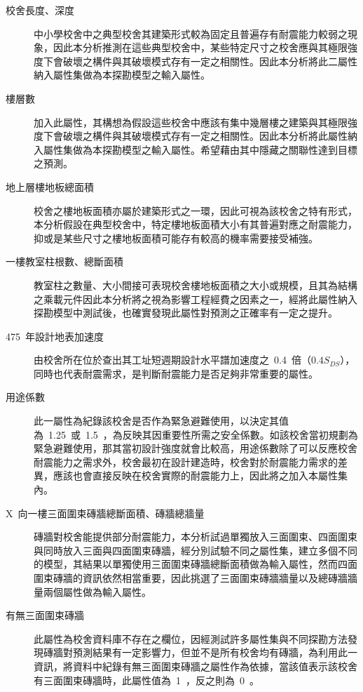 \begin{description}
  \item[校舍長度、深度]
  中小學校舍中之典型校舍其建築形式較為固定且普遍存有耐震能力較弱之現象，因此本分析推測在這些典型校舍中，某些特定尺寸之校舍應與其極限強度下會破壞之構件與其破壞模式存有一定之相關性。因此本分析將此二屬性納入屬性集做為本探勘模型之輸入屬性。
  \item[樓層數]
  加入此屬性，其構想為假設這些校舍中應該有集中幾層樓之建築與其極限強度下會破壞之構件與其破壞模式存有一定之相關性。因此本分析將此屬性納入屬性集做為本探勘模型之輸入屬性。希望藉由其中隱藏之關聯性達到目標之預測。
  \item[地上層樓地板總面積]
  校舍之樓地板面積亦屬於建築形式之一環，因此可視為該校舍之特有形式，本分析假設在典型校舍中，特定樓地板面積大小有其普遍對應之耐震能力，抑或是某些尺寸之樓地板面積可能存有較高的機率需要接受補強。
  \item[一樓教室柱根數、總斷面積]
  教室柱之數量、大小間接可表現校舍樓地板面積之大小或規模，且其為結構之乘載元件因此本分析將之視為影響工程經費之因素之一，經將此屬性納入探勘模型中測試後，也確實發現此屬性對預測之正確率有一定之提升。
  \item[475~年設計地表加速度]
  由校舍所在位於查出其工址短週期設計水平譜加速度之~0.4~倍（$0.4S_{DS}$），同時也代表耐震需求，是判斷耐震能力是否足夠非常重要的屬性。
  \item[用途係數]
  此一屬性為紀錄該校舍是否作為緊急避難使用，以決定其值為~1.25~或~1.5~，為反映其因重要性所需之安全係數。如該校舍當初規劃為緊急避難使用，那其當初設計強度就會比較高，用途係數除了可以反應校舍耐震能力之需求外，校舍最初在設計建造時，校舍對於耐震能力需求的差異，應該也會直接反映在校舍實際的耐震能力上，因此將之加入本屬性集內。
  \item[X~向一樓三面圍束磚牆總斷面積、磚牆總牆量]
  磚牆對校舍能提供部分耐震能力，本分析試過單獨放入三面圍束、四面圍束與同時放入三面與四面圍束磚牆，經分別試驗不同之屬性集，建立多個不同的模型，其結果以單獨使用三面圍束磚牆總斷面積做為輸入屬性，然而四面圍束磚牆的資訊依然相當重要，因此挑選了三面圍束磚牆牆量以及總磚牆牆量兩個屬性做為輸入屬性。
  \item[有無三面圍束磚牆]
  此屬性為校舍資料庫不存在之欄位，因經測試許多屬性集與不同探勘方法發現磚牆對預測結果有一定影響力，但並不是所有校舍均有磚牆，為利用此一資訊，將資料中紀錄有無三面圍束磚牆之屬性作為依據，當該值表示該校舍有三面圍束磚牆時，此屬性值為~1~，反之則為~0~。

\end{description}
